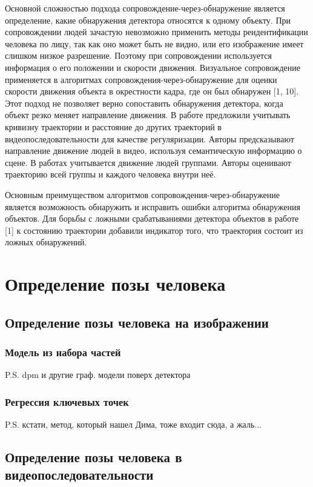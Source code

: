 Основной сложностью подхода сопровождение-через-обнаружение является определение, какие обнаружения детектора относятся к одному объекту. При сопровождении людей зачастую невозможно применить методы реидентификации человека по лицу, так как оно может быть не видно, или его изображение имеет слишком низкое разрешение. Поэтому при сопровождении используется информация о его положении и скорости движения. Визуальное сопровождение применяется в алгоритмах сопровождения-через-обнаружение для оценки скорости движения объекта в окрестности кадра, где он был обнаружен [1, 10]. Этот подход не позволяет верно сопоставить обнаружения детектора, когда объект резко меняет направление движения. В работе \cite{milan2013detection} предложили учитывать кривизну траектории и расстояние до других траекторий в видеопоследовательности для качестве регуляризации. Авторы \cite{gong2011multi} предсказывают направление движение людей в видео, используя семантическую информацию о сцене. В работах \cite{leal2011everybody,choi2012unified} учитывается движение людей группами. Авторы оценивают траекторию всей группы и каждого человека внутри неё.

Основным преимуществом алгоритмов сопровождения-через-обнаружение является возможность обнаружить и исправить ошибки алгоритма обнаружения объектов. Для борьбы с ложными срабатываниями детектора объектов в работе [1] к состоянию траектории добавили индикатор того, что траектория состоит из ложных обнаружений. 

\section{Определение позы человека}
\subsection{Определение позы человека на изображении}
\subsubsection{Модель из набора частей} P.S. dpm и другие граф. модели поверх детектора
\subsubsection{Регрессия ключевых точек} P.S. кстати, метод, который нашел Дима, тоже входит сюда, а жаль...
\subsection{Определение позы человека в видеопоследовательности}

